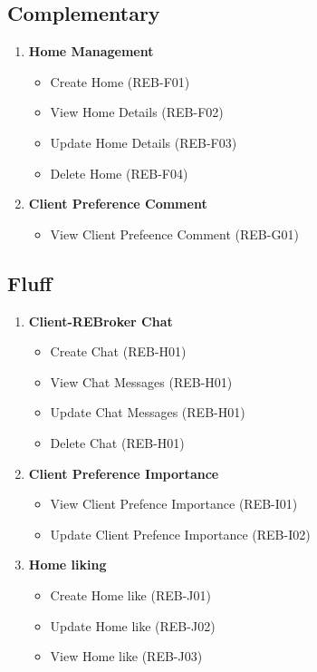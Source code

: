 \documentclass[11pt]{article}
\begin{document}
		\subsection{Complementary}
		\begin{enumerate}[i]
			\item \textbf{Home Management}
			\begin{itemize}
				\item Create Home (REB-F01)
				\item View Home Details (REB-F02)
				\item Update Home Details (REB-F03)
				\item Delete Home (REB-F04)
			\end{itemize}
			
			\item \textbf{Client Preference Comment}
			\begin{itemize}
				\item View Client Prefeence Comment (REB-G01)
			\end{itemize}
			
		\end{enumerate}
		
		\subsection{Fluff}
		\begin{enumerate}[i]
			\item \textbf{Client-REBroker Chat}
			\begin{itemize}
				\item Create Chat (REB-H01)
				\item View Chat Messages (REB-H01)
				\item Update Chat Messages (REB-H01)
				\item Delete Chat (REB-H01)
			\end{itemize}
			
			\item \textbf{Client Preference Importance}
			\begin{itemize}
				\item View Client Prefence Importance (REB-I01)
				\item Update Client Prefence Importance (REB-I02)
			\end{itemize}
			
			\item \textbf{Home liking}
			\begin{itemize}
				\item Create Home like (REB-J01)
				\item Update Home like (REB-J02)
				\item View Home like (REB-J03)
			\end{itemize}
		\end{enumerate}
	
\end{document}
